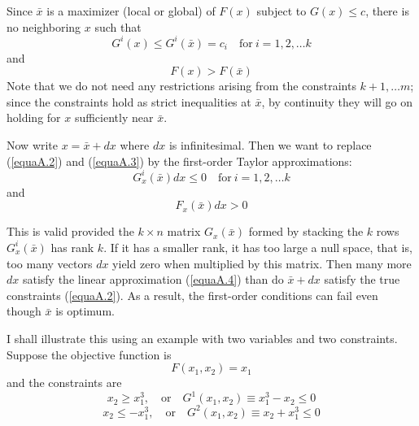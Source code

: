 \begin{appendices}
Since $\bar{x}$ is a maximizer (local or global) of $F(x)$ subject to $G(x) \leq c$, there is no neighboring $x$ such that 
\begin{equation} \label{equaA.2}
 G^i(x) \leq G^i(\bar{x}) = c_i  \quad \mbox{for} \ i=1,2,\dots k
\end{equation}
and
\begin{equation} \label{equaA.3}
F(x) > F(\bar{x})
\end{equation}
Note that we do not need any restrictions arising from the constraints $k+1, \dots m$; since the constraints hold as strict inequalities at $\bar{x}$, by continuity they will go on holding for $x$ sufficiently near $\bar{x}$.

Now write $x=\bar{x} +dx$ where $dx$ is infinitesimal. Then we want to replace (\ref{equaA.2}) and (\ref{equaA.3}) by the first-order Taylor approximations:
\begin{equation} \label{equaA.4}
 G_x^i(\bar{x}) dx \leq 0  \quad \mbox{for} \ i=1,2,\dots k
\end{equation}
and
\begin{equation} \label{equaA.5}
  F_x(\bar{x}) dx > 0
\end{equation}

This is valid provided the $k \times n$ matrix $G_x(\bar{x})$ formed by stacking the $k$ rows $G_x^i(\bar{x})$ has rank $k$. If it has a smaller rank, it has too large a null space, that is, too many vectors $dx$ yield zero when multiplied by this matrix. Then many more $dx$ satisfy the linear approximation (\ref{equaA.4}) than do $\bar{x} +dx$ satisfy the true constraints (\ref{equaA.2}). As a result, the first-order conditions can fail even though $\bar{x}$ is optimum.

I shall illustrate this using an example with two variables and two constraints. Suppose the objective function is 
\begin{equation*}
F(x_1, x_2) = x_1
\end{equation*}
and the constraints are
\begin{equation*}
 x_2 \geq x_1^3, \quad \mbox{or} \quad G^1(x_1, x_2) \equiv x_1^3 - x_2 \leq 0
\end{equation*}
\begin{equation*}
 x_2 \leq - x_1^3, \quad \mbox{or} \quad G^2(x_1, x_2) \equiv x_2 + x_1^3 \leq 0
\end{equation*}

\begin{figure}[!htb] %
\centering %
\end{figure}
\end{appendices}
